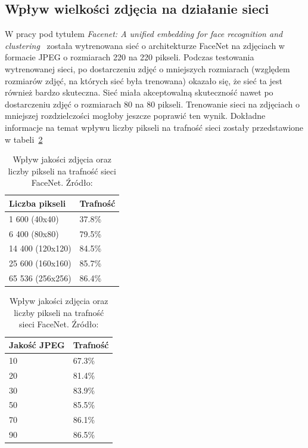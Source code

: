 \subsection{Wpływ wielkości zdjęcia na działanie sieci}

W pracy pod tytułem \textit{Facenet: A unified embedding for face recognition and clustering}~\cite{schroff2015facenet}
została wytrenowana sieć o architekturze FaceNet na zdjęciach w formacie JPEG o rozmiarach 220 na 220 pikseli.
Podczas testowania wytrenowanej sieci, po dostarczeniu zdjęć o mniejszych rozmiarach (względem rozmiarów
zdjęć, na których sieć była trenowana) okazało się, że sieć ta jest również bardzo skuteczna.
Sieć miała akceptowalną skuteczność nawet po dostarczeniu zdjęć o rozmiarach 80 na 80 pikseli.
Trenowanie sieci na zdjęciach o mniejszej rozdzielczości mogłoby jeszcze poprawić ten wynik.
Dokładne informacje na temat wpływu liczby pikseli na
trafność sieci zostały przedstawione w tabeli~\ref{tab:quality_pixels_to_rate}

\begin{table}[]
    \caption{Wpływ jakości zdjęcia oraz liczby pikseli na trafność sieci FaceNet. Źródło: \cite{schroff2015facenet}}
    \label{tab:quality_pixels_to_rate}
    \begin{minipage}{.5\linewidth}
        \centering
        \begin{tabular}{|l|l|}
            \hline
            Liczba pikseli                & Trafność \\ \hline
            1 600 \hspace{15px} (40x40)   & 37.8\%   \\ \hline
            6 400 \hspace{15px}     (80x80)    & 79.5\%   \\ \hline
            14 400 \hspace{10px}  (120x120) & 84.5\%   \\ \hline
            25 600 \hspace{10px}  (160x160) & 85.7\%   \\ \hline
            65 536 \hspace{10px}  (256x256) & 86.4\%   \\ \hline
        \end{tabular}
    \end{minipage}%
    \begin{minipage}{.5\linewidth}
        \centering
        \begin{tabular}{|l|l|}
            \hline
            Jakość JPEG & Trafność \\ \hline
            10          & 67.3\%   \\ \hline
            20          & 81.4\%   \\ \hline
            30          & 83.9\%   \\ \hline
            50          & 85.5\%   \\ \hline
            70          & 86.1\%   \\ \hline
            90          & 86.5\%   \\ \hline
        \end{tabular}
    \end{minipage}
\end{table}

